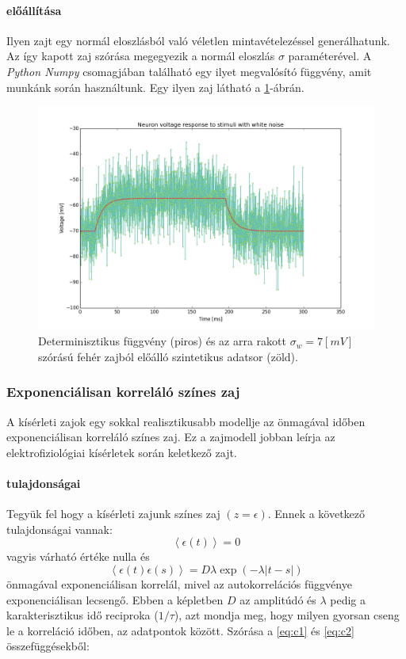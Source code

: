 \paragraph{előállítása}
Ilyen zajt egy normál eloszlásból való véletlen mintavételezéssel generálhatunk. Az így kapott zaj szórása megegyezik a normál eloszlás $\sigma$ paraméterével. A \textit{Python Numpy} csomagjában található egy ilyet megvalósító függvény, amit munkánk során használtunk. Egy ilyen zaj látható a \ref{fig:white}-ábrán.

\begin{figure}[h!]
	\centering
	\includegraphics[width=\textwidth]{./fig/noise/white_noise.png}
	\caption[Fehér zaj]{Determinisztikus függvény (piros) és az arra rakott $\sigma_w = 7\left[mV\right]$ szórású fehér zajból előálló szintetikus adatsor (zöld).}
	\label{fig:white}
\end{figure}



\subsubsection{Exponenciálisan korreláló színes zaj}\label{sec:colored_noise}
A kísérleti zajok egy sokkal realisztikusabb modellje az önmagával időben exponenciálisan korreláló színes zaj. Ez a zajmodell jobban leírja az elektrofiziológiai kísérletek során keletkező zajt. 

\paragraph{tulajdonságai}
Tegyük fel hogy a kísérleti zajunk színes zaj $(z=\epsilon)$. Ennek a következő tulajdonságai vannak:
\begin{equation}\label{eq:c1}
\left<\epsilon(t)\right> = 0
\end{equation}
vagyis várható értéke nulla és
\begin{equation}\label{eq:c2}
\left<\epsilon(t)\epsilon(s)\right> = D\lambda \exp\left(-\lambda\left|t-s\right|\right)
\end{equation}
önmagával exponenciálisan korrelál, mivel az autokorrelációs függvénye exponenciálisan lecsengő. Ebben a képletben $D$ az amplitúdó és $\lambda$ pedig a karakterisztikus idő reciproka ($1/\tau$), azt mondja meg, hogy milyen gyorsan cseng le a korreláció időben, az adatpontok között. Szórása a \ref{eq:c1} és \ref{eq:c2} összefüggésekből:

